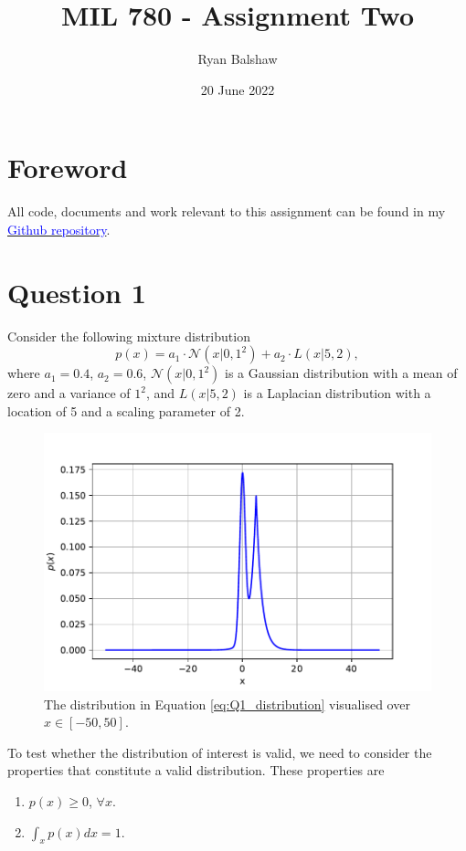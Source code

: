 \documentclass{article}
\title{MIL 780 - Assignment Two}
\author{Ryan Balshaw}
\date{20 June 2022}
\begin{document}
	
	\maketitle
	
	\section*{Foreword}
	All code, documents and work relevant to this assignment can be found in my \href{https://github.com/RyanBalshaw/MIL_780_assignments}{\textcolor{blue}{Github repository}}.
	
	\section{Question 1}
	
	Consider the following mixture distribution
	\begin{equation}\label{eq:Q1_distribution}
		p(x) = a_1 \cdot \mathcal{N}(x \vert 0, 1^2) + a_2 \cdot L(x \vert 5, 2),
	\end{equation}
	where $a_1 = 0.4$, $a_2 = 0.6$, $\mathcal{N}(x \vert 0, 1^2)$ is a Gaussian distribution with a mean of zero and a variance of $1^2$, and $L(x \vert 5, 2)$ is a Laplacian distribution with a location of 5 and a scaling parameter of 2. 
	\begin{figure}[htb!]
		\centering
		\includegraphics[scale=0.6]{Q1a.pdf}
		\caption{The distribution in Equation \eqref{eq:Q1_distribution} visualised over $x \in [-50, 50]$.}
		\label{fig:Q1_distribution}
	\end{figure}
	
	To test whether the distribution of interest is valid, we need to consider the properties that constitute a valid distribution. These properties are 
	\begin{enumerate}
		\item $p(x) \geq 0$, $\forall x$.
		\item $\int_{x} p(x) dx = 1$.
	\end{enumerate}
\end{document}
